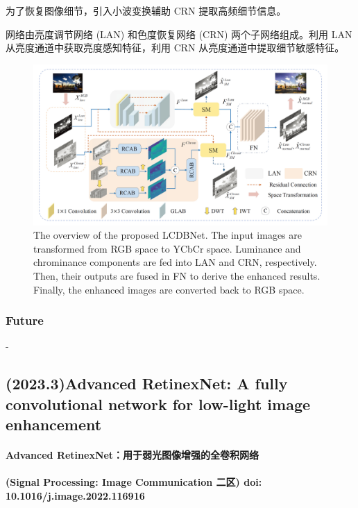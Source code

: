 \documentclass[letterpaper,10pt]{article}
\begin{document}
			为了恢复图像细节，引入小波变换辅助 CRN 提取高频细节信息。
			
			网络由亮度调节网络 (LAN) 和色度恢复网络 (CRN) 两个子网络组成。利用 LAN 从亮度通道中获取亮度感知特征，利用 CRN 从亮度通道中提取细节敏感特征。
			
			\begin{figure}[htbp]
				\centering 
				\includegraphics[width=\columnwidth]{picture/LLIE/LCDBNet}
				\caption{
					\label{fig: LCDBNet} 
					The overview of the proposed LCDBNet. The input images are transformed from RGB space to YCbCr space. Luminance and
					chrominance components are fed into LAN and CRN, respectively. Then, their outputs are fused in FN to derive the enhanced results.
					Finally, the enhanced images are converted back to RGB space.
				}
			\end{figure}
			
			\subsubsection{Future}
		
			-
			
		\subsection{(2023.3)Advanced RetinexNet: A fully convolutional network for low-light image enhancement}
			
		\paragraph{Advanced RetinexNet：用于弱光图像增强的全卷积网络}
			
		\paragraph{(Signal Processing: Image Communication 二区) doi: 10.1016/j.image.2022.116916}
			
\end{document}
